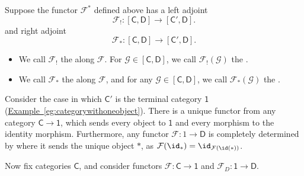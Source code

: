 \documentclass[notes.tex]{subfiles}
\begin{document}
\begin{definition}
  \label{def:kan_extension}
  Suppose the functor $\mathcal{F}^{*}$ defined above has a left adjoint
  \begin{equation*}
    \mathcal{F}_{!}\colon [\mathsf{C}, \mathsf{D}] \to [\mathsf{C}', \mathsf{D}].
  \end{equation*}
  and right adjoint
  \begin{equation*}
    \mathcal{F}_{*}\colon [\mathsf{C}, \mathsf{D}] \to [\mathsf{C}', \mathsf{D}].
  \end{equation*}
  \begin{itemize}
    \item We call $\mathcal{F}_{!}$ the  along $\mathcal{F}$. For $\mathcal{\mathcal{G}} \in [\mathsf{C}, \mathsf{D}]$, we call $\mathcal{F}_{!}(\mathcal{G})$ the . 
          
    \item We call $\mathcal{F}_{*}$ the  along $\mathcal{F}$, and for any $\mathcal{G} \in [\mathsf{C}, \mathsf{D}]$, we call $\mathcal{F}_{*}(\mathcal{G})$ the .
  \end{itemize}
\end{definition}

\begin{example}
  Consider the case in which $\mathsf{C}'$ is the terminal category $\mathsf{1}$ (\hyperref[eg:categorywithoneobject]{Example~\ref*{eg:categorywithoneobject}}). There is a unique functor from any category $\mathsf{C} \to \mathsf{1}$, which sends every object to $\mathsf{1}$ and every morphism to the identity morphism. Furthermore, any functor $\mathcal{F}\colon 1 \to \mathsf{D}$ is completely determined by where it sends the unique object $*$, as $\mathcal{F}(\id_{*}) = \id_{\mathcal{F}(\id(*))}$.

  Now fix categories $\mathsf{C}$, and consider functors $\mathcal{F}\colon \mathsf{C} \to \mathsf{1}$ and $\mathcal{F}_{D}\colon \mathsf{1} \to \mathsf{D}$.
\end{example}
\end{document}
